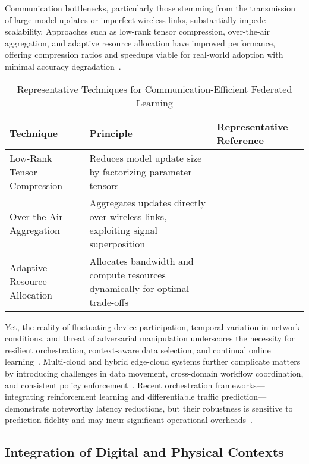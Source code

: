 \documentclass[sigconf]{acmart}
\begin{document}
Communication bottlenecks, particularly those stemming from the transmission of large model updates or imperfect wireless links, substantially impede scalability. Approaches such as low-rank tensor compression, over-the-air aggregation, and adaptive resource allocation have improved performance, offering compression ratios and speedups viable for real-world adoption with minimal accuracy degradation~\cite{ref39,ref42,ref48}. 

\begin{table*}[htbp]
\centering
\caption{Representative Techniques for Communication-Efficient Federated Learning}
\label{tab:fed_techniques}
\begin{adjustbox}{max width=\textwidth}
\begin{tabular}{lll}
\toprule
\textbf{Technique} & \textbf{Principle} & \textbf{Representative Reference} \\
\midrule
Low-Rank Tensor Compression & Reduces model update size by factorizing parameter tensors & \cite{ref39} \\
Over-the-Air Aggregation    & Aggregates updates directly over wireless links, exploiting signal superposition & \cite{ref42} \\
Adaptive Resource Allocation & Allocates bandwidth and compute resources dynamically for optimal trade-offs & \cite{ref48} \\
\bottomrule
\end{tabular}
\end{adjustbox}
\end{table*}

Yet, the reality of fluctuating device participation, temporal variation in network conditions, and threat of adversarial manipulation underscores the necessity for resilient orchestration, context-aware data selection, and continual online learning~\cite{ref25,ref39}. Multi-cloud and hybrid edge-cloud systems further complicate matters by introducing challenges in data movement, cross-domain workflow coordination, and consistent policy enforcement~\cite{ref26,ref48}. Recent orchestration frameworks—integrating reinforcement learning and differentiable traffic prediction—demonstrate noteworthy latency reductions, but their robustness is sensitive to prediction fidelity and may incur significant operational overheads~\cite{ref42}.

\subsection{Integration of Digital and Physical Contexts}
\end{document}
